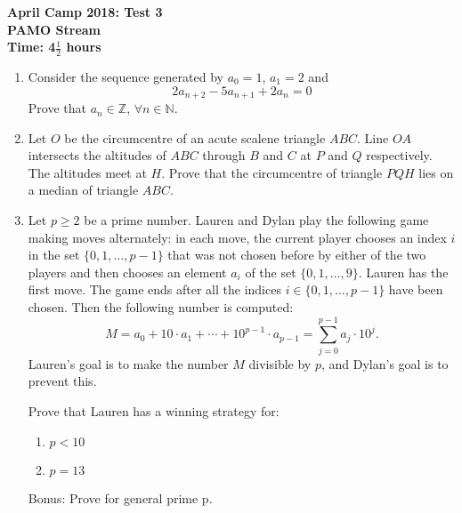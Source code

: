 \documentclass[a4paper,12pt]{article}
\begin{document}
\setcounter{page}{1}

\begin{center}
	\textbf{April Camp 2018: Test 3}\\
	\textbf{PAMO Stream}\\
	\textbf{Time: 4$\frac{1}{2}$ hours}
\end{center}

\begin{enumerate}
\vspace{0.2cm}

\item %
Consider the sequence generated by $a_0=1$, $a_1=2$ and 
\[2a_{n+2}-5a_{n+1}+2a_n =0\]
Prove that $a_n \in \mathbb{Z}$, $\forall n \in \mathbb{N}$. 


\item %
Let $O$ be the circumcentre of an acute scalene triangle $ABC$. Line $OA$ intersects the altitudes of $ABC$ through $B$ and $C$ at $P$ and $Q$ respectively. The altitudes meet at $H$. Prove that the circumcentre of triangle $PQH$ lies on a median of triangle $ABC$.


\item %
Let $p \geq 2$ be a prime number. Lauren and Dylan play the following game making moves alternately: in each move, the current player chooses an index $i$ in the set $\{0, 1, \dotsc, p-1\}$ that was not chosen before by either of the two players and then chooses an element $a_i$ of the set $\{0, 1, \dotsc, 9\}$. Lauren has the first move. The game ends after all the indices $i \in \{0, 1, \dotsc, p-1\}$ have been chosen. Then the following number is computed:
\[ M = a_0 +10\cdot a_1 +\dotsb +10^{p-1} \cdot a_{p-1} = \sum_{j=0}^{p-1} a_j \cdot 10^j. \]
Lauren's goal is to make the number $M$ divisible by $p$, and Dylan's goal is to prevent this.

Prove that Lauren has a winning strategy for:
\begin{enumerate}
	\item $p<10$
	\item $p=13$
\end{enumerate}
Bonus: Prove for general prime p.  
\end{enumerate}
\end{document}
